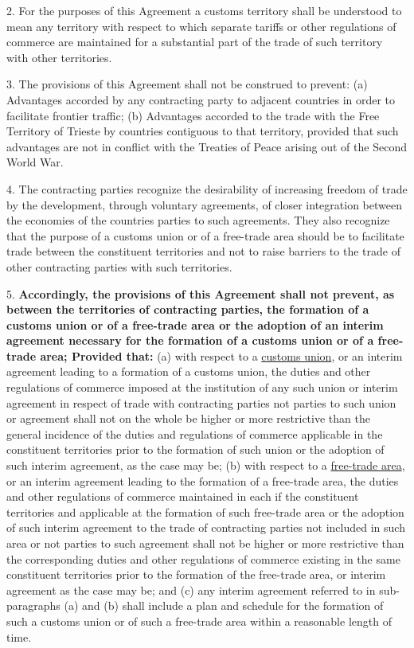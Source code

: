 \documentclass{nuevotema}
\begin{document}
2. For the purposes of this Agreement a customs territory shall be
understood to mean any territory with respect to which separate tariffs or
other regulations of commerce are maintained for a substantial part of the
trade of such territory with other territories.

3. The provisions of this Agreement shall not be construed to
prevent:
(a) Advantages accorded by any contracting party to adjacent
countries in order to facilitate frontier traffic;
(b) Advantages accorded to the trade with the Free Territory of
Trieste by countries contiguous to that territory, provided that
such advantages are not in conflict with the Treaties of Peace
arising out of the Second World War.

4. The contracting parties recognize the desirability of increasing
freedom of trade by the development, through voluntary agreements, of
closer integration between the economies of the countries parties to such
agreements. They also recognize that the purpose of a customs union or of
a free-trade area should be to facilitate trade between the constituent
territories and not to raise barriers to the trade of other contracting parties
with such territories.

5. \textbf{Accordingly, the provisions of this Agreement shall not prevent,
as between the territories of contracting parties, the formation of a
customs union or of a free-trade area or the adoption of an interim
agreement necessary for the formation of a customs union or of a free-
trade area; Provided that:} (a) with respect to a \underline{customs union}, or an interim agreement leading to a formation of a customs union, the duties and other
regulations of commerce imposed at the institution of any such
union or interim agreement in respect of trade with contracting
parties not parties to such union or agreement shall not on the
whole be higher or more restrictive than the general incidence of
the duties and regulations of commerce applicable in the
constituent territories prior to the formation of such union or the
adoption of such interim agreement, as the case may be; (b) with respect to a \underline{free-trade area}, or an interim agreement leading
to the formation of a free-trade area, the duties and other
regulations of commerce maintained in each if the constituent
territories and applicable at the formation of such free-trade area
or the adoption of such interim agreement to the trade of
contracting parties not included in such area or not parties to
such agreement shall not be higher or more restrictive than the
corresponding duties and other regulations of commerce existing
in the same constituent territories prior to the formation of the
free-trade area, or interim agreement as the case may be; and
(c) any interim agreement referred to in sub-paragraphs (a) and (b)
shall include a plan and schedule for the formation of such a
customs union or of such a free-trade area within a reasonable
length of time.
\end{document}
